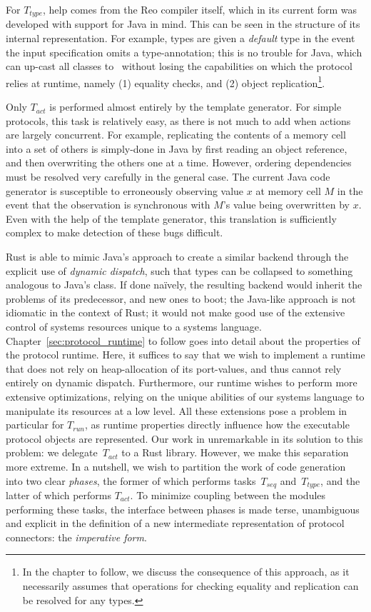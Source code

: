 For $T_{type}$, help comes from the Reo compiler itself, which in its current form was developed with support for Java in mind. This can be seen in the structure of its internal representation. For example, types are given a \textit{default} type in the event the input specification omits a type-annotation; this is no trouble for Java, which can up-cast all classes to~ without losing the capabilities on which the protocol relies at runtime, namely (1) equality checks, and (2) object replication\footnote{In the chapter to follow, we discuss the consequence of this approach, as it necessarily assumes that operations for checking equality and replication can be resolved for any types.}.

Only $T_{act}$ is performed almost entirely by the template generator. For simple protocols, this task is relatively easy, as there is not much to add when actions are largely concurrent. For example, replicating the contents of a memory cell into a set of others is simply-done in Java by first reading an object reference, and then overwriting the others one at a time. However, ordering dependencies must be resolved very carefully in the general case. The current Java code generator is susceptible to erroneously observing value $x$ at memory cell $M$ in the event that the observation is synchronous with $M$'s value being overwritten by $x$. Even with the help of the template generator, this translation is sufficiently complex to make detection of these bugs difficult.

Rust is able to mimic Java's approach to create a similar backend through the explicit use of \textit{dynamic dispatch}, such that types can be collapsed to something analogous to Java's  class. If done na\"ively, the resulting backend would inherit the problems of its predecessor, and new ones to boot; the Java-like approach is not idiomatic in the context of Rust; it would not make good use of the extensive control of systems resources unique to a systems language. Chapter~\ref{sec:protocol_runtime} to follow goes into detail about the properties of the protocol runtime. Here, it suffices to say that we wish to implement a runtime that does not rely on heap-allocation of its port-values, and thus cannot rely entirely on dynamic dispatch. Furthermore, our runtime wishes to perform more extensive optimizations, relying on the unique abilities of our systems language to manipulate its resources at a low level. All these extensions pose a problem in particular for $T_{run}$, as runtime properties directly influence how the executable protocol objects are represented. Our work in unremarkable in its solution to this problem: we delegate~$T_{act}$ to a Rust library. However, we make this separation more extreme. In a nutshell, we wish to partition the work of code generation into two clear \textit{phases}, the former of which performs tasks~$T_{seq}$ and~$T_{type}$, and the latter of which performs $T_{act}$. To minimize coupling between the modules performing these tasks, the interface between phases is made terse, unambiguous and explicit in the definition of a new intermediate representation of protocol connectors: the \textit{imperative form}.

